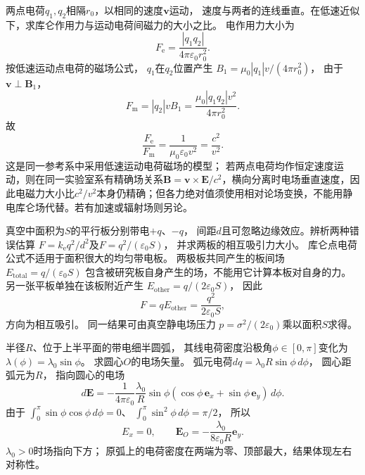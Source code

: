 

\problemtext 两点电荷$q_1,q_2$相隔$r_0$，以相同的速度$\bm v$运动，
速度与两者的连线垂直。在低速近似下，求库仑作用力与运动电荷间磁力的大小之比。
\workings
电作用力大小为
\[
F_{\mathrm e}=\frac{|q_1q_2|}{4\pi\varepsilon_0r_0^2}.
\]
按低速运动点电荷的磁场公式，
$q_1$在$q_2$位置产生
$B_1=\mu_0|q_1|v/(4\pi r_0^2)$，
由于$\bm v\perp\bm B_1$，
\[
F_{\mathrm m}=|q_2|v B_1
=\frac{\mu_0|q_1q_2|v^2}{4\pi r_0^2}.
\]
故
\[
\boxed{\frac{F_{\mathrm e}}{F_{\mathrm m}}
=\frac{1}{\mu_0\varepsilon_0v^2}
=\frac{c^2}{v^2}}.
\]
\crosscheck 这是同一参考系中采用低速运动电荷磁场的模型；
若两点电荷均作恒定速度运动，则在同一实验室系有精确场关系$\bm B=\bm v\times\bm E/c^2$，横向分离时电场垂直速度，因此电磁力大小比$c^2/v^2$本身仍精确；但各力绝对值须使用相对论场变换，不能用静电库仑场代替。若有加速或辐射场则另论。

\problemtext 真空中面积为$S$的平行板分别带电$+q$、$-q$，
间距$d$且可忽略边缘效应。辨析两种错误估算
$F=k_{\mathrm e}q^2/d^2$及$F=q^2/(\varepsilon_0S)$，
并求两板的相互吸引力大小。
\workings
库仑点电荷公式不适用于面积很大的均匀带电板。
两极板共同产生的板间场
$E_{\mathrm{total}}=q/(\varepsilon_0S)$
包含被研究板自身产生的场，不能用它计算本板对自身的力。
另一张平板单独在该板附近产生
$E_{\mathrm{other}}=q/(2\varepsilon_0S)$，
因此
\[
\boxed{F=qE_{\mathrm{other}}
=\frac{q^2}{2\varepsilon_0S}},
\]
方向为相互吸引。
\crosscheck 同一结果可由真空静电场压力
$p=\sigma^2/(2\varepsilon_0)$乘以面积$S$求得。

\problemtext 半径$R$、位于上半平面的带电细半圆弧，
其线电荷密度沿极角$\phi\in[0,\pi]$变化为
$\lambda(\phi)=\lambda_0\sin\phi$。
求圆心$O$的电场矢量。
\workings
弧元电荷$dq=\lambda_0R\sin\phi\,d\phi$，
圆心距弧元为$R$，
指向圆心的电场
\[
d\bm E=-\frac{1}{4\pi\varepsilon_0}
\frac{\lambda_0}{R}\sin\phi
(\cos\phi\,\bm e_x+\sin\phi\,\bm e_y)\,d\phi.
\]
由于
$\int_0^\pi\sin\phi\cos\phi\,d\phi=0$、
$\int_0^\pi\sin^2\phi\,d\phi=\pi/2$，
所以
\[
\boxed{E_x=0,\qquad
\bm E_O=-\frac{\lambda_0}{8\varepsilon_0R}\bm e_y}.
\]
\crosscheck $\lambda_0>0$时场指向下方；
原弧上的电荷密度在两端为零、顶部最大，结果体现左右对称性。

